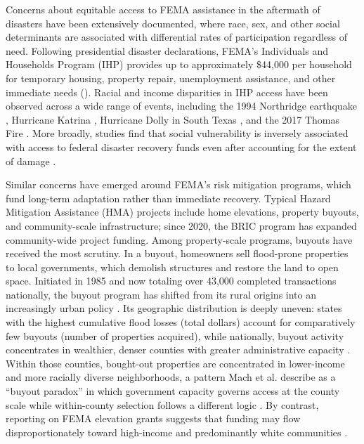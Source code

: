 \documentclass[
  authoryear,
  preprint]{elsarticle}
\begin{document}
Concerns about equitable access to FEMA assistance in the aftermath of
disasters have been extensively documented, where race, sex, and other
social determinants are associated with differential rates of
participation regardless of need. Following presidential disaster
declarations, FEMA's Individuals and Households Program (IHP) provides
up to approximately \$44,000 per household for temporary housing,
property repair, unemployment assistance, and other immediate needs
(\citet{fema2024ihp}). Racial and income disparities in IHP access have
been observed across a wide range of events, including the 1994
Northridge earthquake
\citep{bolinNorthridgeEarthquakeCommunitybased1998}, Hurricane Katrina
\citep{kamelSocialMarginalisationFederal2012}, Hurricane Dolly in South
Texas \citep{riveraProceduralVulnerabilityIts2022}, and the 2017 Thomas
Fire \citep{mendezInvisibleVictimsDisaster2020}. More broadly, studies
find that social vulnerability is inversely associated with access to
federal disaster recovery funds even after accounting for the extent of
damage
\citep{emrichAssessingDistributiveInequities2022, drakesSocialVulnerabilityShortTerm2021, wilsonFloodRecoveryOutcomes2021, bentoRaciallyUnequalImpacts2022}.

Similar concerns have emerged around FEMA's risk mitigation programs,
which fund long-term adaptation rather than immediate recovery. Typical
Hazard Mitigation Assistance (HMA) projects include home elevations,
property buyouts, and community-scale infrastructure; since 2020, the
BRIC program has expanded community-wide project funding. Among
property-scale programs, buyouts have received the most scrutiny. In a
buyout, homeowners sell flood-prone properties to local governments,
which demolish structures and restore the land to open space. Initiated
in 1985 and now totaling over 43,000 completed transactions nationally,
the buyout program has shifted from its rural origins into an
increasingly urban policy \citep{machManagedRetreatVoluntary2019}. Its
geographic distribution is deeply uneven: states with the highest
cumulative flood losses (total dollars) account for comparatively few
buyouts (number of properties acquired), while nationally, buyout
activity concentrates in wealthier, denser counties with greater
administrative capacity \citep{machManagedRetreatVoluntary2019}. Within
those counties, bought-out properties are concentrated in lower-income
and more racially diverse neighborhoods, a pattern Mach et al.
\citeyearpar{machManagedRetreatVoluntary2019} describe as a ``buyout
paradox'' in which government capacity governs access at the county
scale while within-county selection follows a different logic
\citep{elliottRacialInequitiesFederal2020a, loughranUnequalRetreatsHow2022}.
By contrast, reporting on FEMA elevation grants suggests that funding
may flow disproportionately toward high-income and predominantly white
communities \citep{frankFEMAHomeElevation2022}.
\end{document}
